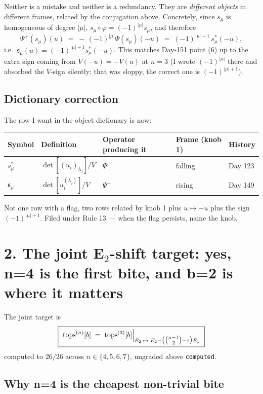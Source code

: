 \documentclass[11pt,a4paper]{article}
\newcommand{\Psip}{\Psi^{+}}
\newcommand{\fs}{\mathfrak{s}}
\begin{document}
Neither is a mistake and neither is a redundancy. They are \emph{different objects}
in different frames, related by the conjugation above. Concretely, since $s_\mu$ is
homogeneous of degree $|\mu|$, $s_\mu\circ\varphi = (-1)^{|\mu|}s_\mu$, and therefore
\[
\Psip(s_\mu)(u) \;=\; -\,(-1)^{|\mu|}\Psi(s_\mu)(-u)
\;=\; (-1)^{|\mu|+1}\, s^*_\mu(-u),
\]
i.e.\ $\fs_\mu(u) = (-1)^{|\mu|+1}s^*_\mu(-u)$. This matches Day-151 point (6) up to
the extra sign coming from $V(-u) = -V(u)$ at $n=3$ (I wrote $(-1)^{|\mu|}$ there and
absorbed the $V$-sign silently; that was sloppy, the correct one is $(-1)^{|\mu|+1}$).

\subsection*{Dictionary correction}

The row I want in the object dictionary is now:

\begin{center}
\begin{tabular}{@{}lllll@{}}
\hline
Symbol & Definition & Operator producing it & Frame (knob 1) & History \\
\hline
$s^*_\mu$ & $\det[(u_i)_{\lambda_j}]/V$    & $\Psi$    & falling & Day 123 \\
$\fs_\mu$ & $\det[u_i^{(\lambda_j)}]/V$    & $\Psip$   & rising  & Day 149 \\
\hline
\end{tabular}
\end{center}

Not one row with a flag, two rows related by knob 1 plus $u\mapsto -u$ plus the
sign $(-1)^{|\mu|+1}$. Filed under Rule 13 --- when the flag persists, name the knob.

\section*{2. The joint E$_2$-shift target: yes, n=4 is the first bite, and b=2 is where it matters}

The joint target is
\[
\boxed{\ \mathrm{tops}^{(n)}[b] \;=\; \mathrm{tops}^{(3)}[b]\Big|_{E_2\;\mapsto\;
E_2 - \bigl(\tbinom{n-1}{2}-1\bigr)E_1}\ }
\]
computed to $26/26$ across $n\in\{4,5,6,7\}$, ungraded above \texttt{computed}.

\subsection*{Why n=4 is the cheapest non-trivial bite}
\end{document}
